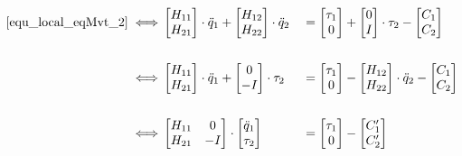 \documentclass{report}
\begin{document}
\begin{alignat}{2}
\eqref{equ_local_eqMvt_2} \iff
&\begin{bmatrix}
  H_{11} \\
  H_{21}
\end{bmatrix} 
\cdot \ddot{q}_1
+
\begin{bmatrix}
  H_{12} \\
  H_{22}
\end{bmatrix}
\cdot \ddot{q}_2
&&=
\begin{bmatrix}
  \tau_1 \\
  0
\end{bmatrix} 
+
\begin{bmatrix}
  0 \\
  I
\end{bmatrix} 
\cdot \tau_2
-
\begin{bmatrix}
  C_{1} \\
  C_{2}
\end{bmatrix} \notag \\
\notag \\
\iff
&\begin{bmatrix}
  H_{11} \\
  H_{21}
\end{bmatrix} 
\cdot \ddot{q}_1
+
\begin{bmatrix}
  0 \\
  -I
\end{bmatrix} 
\cdot \tau_2
&&=
\begin{bmatrix}
  \tau_1 \\
  0
\end{bmatrix} 
-
\begin{bmatrix}
  H_{12} \\
  H_{22}
\end{bmatrix}
\cdot \ddot{q}_2
-
\begin{bmatrix}
  C_{1} \\
  C_{2}
\end{bmatrix} \label{equ_equationMvt_dynHyb1} \\
\notag \\
\iff
&\begin{bmatrix}
  H_{11} & 0 \\
  H_{21} &  -I
\end{bmatrix} 
\cdot
\begin{bmatrix}
  \ddot{q}_1 \\
  \tau_2
\end{bmatrix} 
&&=
\begin{bmatrix}
  \tau_1 \\
  0
\end{bmatrix} 
-
\begin{bmatrix}
  C'_{1} \\
  C'_{2}
\end{bmatrix}
\end{alignat}
\end{document}
